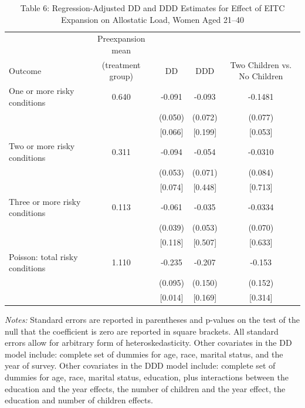 \begin{table}[htbp]
\centering
\caption{Table 6: Regression-Adjusted DD and DDD Estimates for Effect of EITC Expansion on Allostatic Load, Women Aged 21--40}
\begin{tabular}{lcccc}
\toprule
 & Preexpansion mean & & & \\
Outcome & (treatment group) & DD & DDD & Two Children vs. No Children \\
\midrule
One or more risky conditions & 0.640 & -0.091 & -0.093  & -0.1481 \\
 &  & (0.050) & (0.072) & (0.077) \\
 &  & [0.066] & [0.199] & [0.053] \\
\addlinespace
Two or more risky conditions & 0.311 & -0.094 & -0.054  & -0.0310 \\
 &  & (0.053) & (0.071) & (0.084) \\
 &  & [0.074] & [0.448] & [0.713] \\
\addlinespace
Three or more risky conditions & 0.113 & -0.061 & -0.035  & -0.0334 \\
 &  & (0.039) & (0.053) & (0.070) \\
 &  & [0.118] & [0.507] & [0.633] \\
\addlinespace
Poisson: total risky conditions & 1.110 & -0.235 & -0.207 & -0.153 \\
 &  & (0.095) & (0.150) & (0.152) \\
 &  & [0.014] & [0.169] & [0.314] \\
\bottomrule
\end{tabular}
\begin{minipage}{\linewidth}
\smallskip\footnotesize
\textit{Notes:} Standard errors are reported in parentheses and p-values on the test of the null that the coefficient is zero are reported in square brackets. All standard errors allow for arbitrary form of heteroskedasticity. Other covariates in the DD model include: complete set of dummies for age, race, marital status, and the year of survey. Other covariates in the DDD model include: complete set of dummies for age, race, marital status, education, plus interactions between the education and the year effects, the number of children and the year effect, the education and number of children effects. \\
\end{minipage}
\end{table}
